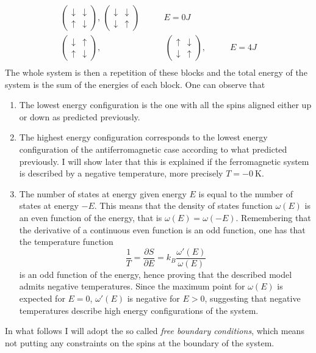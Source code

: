 \begin{align*}
    \begin{pmatrix} \downarrow & \downarrow \\ \uparrow & \downarrow \end{pmatrix}, \,
    \begin{pmatrix} \downarrow & \downarrow \\ \downarrow & \uparrow \end{pmatrix} \qquad &E = 0J \\
    \begin{pmatrix} \downarrow & \uparrow \\ \uparrow & \downarrow \end{pmatrix},& \,
    \begin{pmatrix} \uparrow & \downarrow \\ \downarrow & \uparrow \end{pmatrix}, \qquad &E = 4J \\
\end{align*}
The whole system is then a repetition of these blocks and the total energy of the system is the sum of the energies of each block. One can observe 
that 
\begin{enumerate}
    \item The lowest energy configuration is the one with all the spins aligned either up or down as predicted previously.
    \item The highest energy configuration corresponds to the lowest energy configuration of the antiferromagnetic case according to what predicted previously. I will show later that this 
    is explained if the ferromagnetic system is described by a negative temperature, more precisely $T = -\SI{0}{\kelvin}$.
    \item The number of states at energy given energy $E$ is equal to the number of states at energy $-E$. This means that the density of states function $\omega(E)$ is an even function 
    of the energy, that is $\omega(E) = \omega(-E)$. Remembering that the derivative of a continuous even function is an odd function, one has that the temperature function
    \begin{equation*}
        \frac{1}{T} = \frac{\partial S}{\partial E} = k_B \frac{\omega'(E)}{\omega(E)}
    \end{equation*}
    is an odd function of the energy, hence proving that the described model admits negative temperatures. Since the maximum point for $\omega(E)$ is expected for $E=0$, $\omega'(E)$ is negative for $E>0$,
    suggesting that negative temperatures describe high energy configurations of the system.
\end{enumerate}
In what follows I will adopt the so called \emph{free boundary conditions}, which means not putting any constraints on the spins at the boundary of the system.

